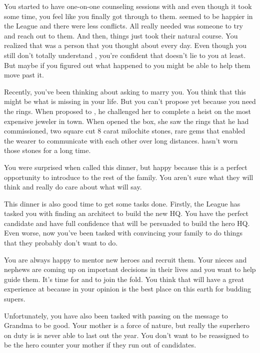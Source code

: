 \documentclass[char]{LRSguildcamp1}
\begin{document}
You started to have one-on-one counseling sessions with \cYS{} and even though it took some time, you feel like you finally got through to them. \cYS{} seemed to be happier in the League and there were less conflicts.  All\cYS{} really needed was someone to try and reach out to them. And then, things just took their natural course. You realized that \cYS{} was a person that you thought about every day. Even though you still don't totally understand  \cYS {\them}, you're confident that \cYS{} doesn't lie to you at least. But maybe if you figured out what happened to \cYS{} you might be able to help them move past it. 
 
Recently, you've been thinking about asking \cYS{} to marry you. You think that this might be what is missing in your life. But you can't propose yet because you need the rings. When \cGS{} proposed to \cGrandma{}, he challenged her to complete a heist on the most expensive jeweler in town. When \cGrandma{} opened the box, she saw the rings that he had commissioned, two square cut 8 carat milochite stones, rare gems that enabled the wearer to communicate with each other over long distances.  \cGrandma{} hasn't worn those stones for a long time. 

You were surprised when \cGrandma{} called this dinner, but happy because this is a perfect opportunity to introduce \cYS{} to the rest of the family. You aren't sure what they will think and really do care about what \cGrandma{} will say. 

This dinner is also good time to get some tasks done. Firstly, the League has tasked you with finding an architect to build the new HQ. You have the perfect candidate and have full confidence that \cArchitect{} will be persuaded to build the hero HQ. Even worse, now you've been tasked with convincing your family to do things that they probably don't want to do. 

You are always happy to mentor new heroes and recruit them. Your nieces and nephews are coming up on important decisions in their lives and you want to help guide them. It's time for \cGrad{} and \cTeen{} to join the fold. You think that \cTween{} will have a great experience at \pSuperSchool{} because in your opinion \pSuperSchool{} is the best place on this earth for budding supers. 

Unfortunately, you have also been tasked with passing on the message to Grandma to be good. Your mother is a force of nature, but really the superhero on duty is \pCityGrandma{} is never able to last out the year. You don't want to be reassigned to be the hero counter your mother if they run out of candidates. 
\end{document}
